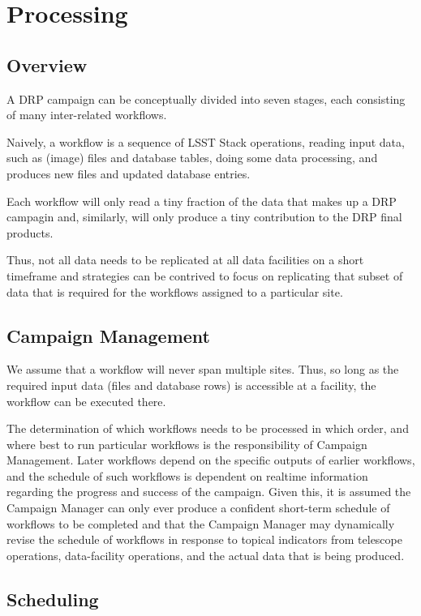 \section{Processing}

\subsection{Overview}

A DRP campaign can be conceptually divided into seven stages, each consisting of many inter-related workflows.

Naively, a workflow is a sequence of LSST Stack operations, reading input data, such as (image) files and database tables, doing some data processing, and produces new files and updated database entries.

Each workflow will only read a tiny fraction of the data that makes up a DRP campagin and, similarly, will only produce a tiny contribution to the DRP final products.

Thus, not all data needs to be replicated at all data facilities on a short timeframe and strategies can be contrived to focus on replicating that subset of data that is required for the workflows assigned to a particular site.

\subsection{Campaign Management}

We assume that a workflow will never span multiple sites. Thus, so long as the required input data (files and database rows) is accessible at a facility, the workflow can be executed there.

The determination of which workflows needs to be processed in which order, and where best to run particular workflows is the responsibility of Campaign Management. Later workflows depend on the specific outputs of earlier workflows, and the schedule of such workflows is dependent on realtime information regarding the progress and success of the campaign. Given this, it is assumed the Campaign Manager can only ever produce a confident short-term schedule of workflows to be completed and that the Campaign Manager may dynamically revise the schedule of workflows in response to topical indicators from telescope operations, data-facility operations, and the actual data that is being produced.

\subsection{Scheduling}

